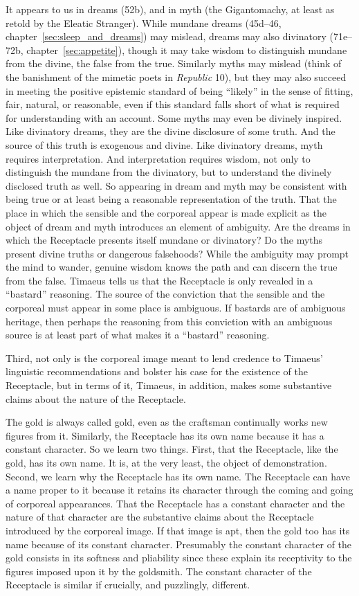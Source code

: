It appears to us in dreams (52b), and in myth (the Gigantomachy, at least as retold by the Eleatic Stranger). While mundane dreams (45d--46, chapter~\ref{sec:sleep_and_dreams}) may mislead, dreams may also divinatory (71e--72b, chapter~\ref{sec:appetite}), though it may take wisdom to distinguish mundane from the divine, the false from the true. Similarly myths may mislead (think of the banishment of the mimetic poets in \emph{Republic} 10), but they may also succeed in meeting the positive epistemic standard of being ``likely'' in the sense of fitting, fair, natural, or reasonable, even if this standard falls short of what is required for understanding with an account. Some myths may even be divinely inspired. Like divinatory dreams, they are the divine disclosure of some truth. And the source of this truth is exogenous and divine. Like divinatory dreams, myth requires interpretation. And interpretation requires wisdom, not only to distinguish the mundane from the divinatory, but to understand the divinely disclosed truth as well. So appearing in dream and myth may be consistent with being true or at least being a reasonable representation of the truth. That the place in which the sensible and the corporeal appear is made explicit as the object of dream and myth introduces an element of ambiguity. Are the dreams in which the Receptacle presents itself mundane or divinatory? Do the myths present divine truths or dangerous falsehoods? While the ambiguity may prompt the mind to wander, genuine wisdom knows the path and can discern the true from the false. Timaeus tells us that the Receptacle is only revealed in a ``bastard'' reasoning. The source of the conviction that the sensible and the corporeal must appear in some place is ambiguous. If bastards are of ambiguous heritage, then perhaps the reasoning from this conviction with an ambiguous source is at least part of what makes it a ``bastard'' reasoning.

Third, not only is the corporeal image meant to lend credence to Timaeus' linguistic recommendations and bolster his case for the existence of the Receptacle, but in terms of it, Timaeus, in addition, makes some substantive claims about the nature of the Receptacle. 

The gold is always called gold, even as the craftsman continually works new figures from it. Similarly, the Receptacle has its own name because it has a constant character. So we learn two things. First, that the Receptacle, like the gold, has its own name. It is, at the very least, the object of demonstration. Second, we learn why the Receptacle has its own name. The Receptacle can have a name proper to it because it retains its character through the coming and going of corporeal appearances. That the Receptacle has a constant character and the nature of that character are the substantive claims about the Receptacle introduced by the corporeal image. If that image is apt, then the gold too has its name because of its constant character. Presumably the constant character of the gold consists in its softness and pliability since these explain its receptivity to the figures imposed upon it by the goldsmith. The constant character of the Receptacle is similar if crucially, and puzzlingly, different.

